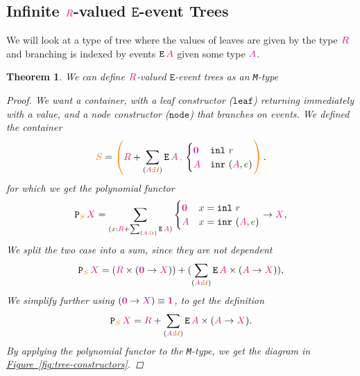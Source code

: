 \documentclass[twoside,11pt,openright]{report}
\theoremstyle{plain} %
\newtheorem{thm}{Theorem}[section]
\theoremstyle{definition}
\theoremstyle{remark}
\newcommand*{\figref}[1]{\hyperref[fig:#1]{Figure~\ref*{fig:#1}}}
\newcommand*{\term}[1]{\textcolor{green!30!black}{#1}} %
\newcommand*{\type}[1]{\textcolor{magenta!90!black}{#1}}
\newcommand*{\container}[1]{\textcolor{orange}{#1}}
\newcommand*{\containerpair}[2]{\ensuremath{\colorlet{savedleftcolor}{.}\color{orange}\left(\color{savedleftcolor}#1\,\textcolor{orange}{\mathbf{,}}\,#2\color{orange}\right)\color{savedleftcolor}}}
\newcommand*{\universe}[1]{\textcolor{orange!80!black}{#1}}
\newcommand*{\unit}{\type{\textbf{1}}}
\newcommand*{\empt}{\type{\textbf{0}}}
\newcommand*{\constructor}[1]{\textcolor{purple!60!black}{\ensuremath{\mathtt{#1}}}}
\newcommand*{\typeformer}[1]{\ensuremath{\mathtt{#1}}}
\newcommand*{\functor}[1]{\ensuremath{\mathbf{\mathtt{#1}}}}
\begin{document}
\subsection{Infinite \(\type{R}\)-valued \(\typeformer{E}\)-event Trees}
We will look at a type of tree where the values of leaves are given by the type \(\type{R}\) and branching is indexed by events \(\typeformer{E}\,\type{A}\) given some type \(\type{A}\).
\begin{thm}
  We can define \(\type{R}\)-valued \(\typeformer{E}\)-event trees as an \texttt{M}-type
  \begin{proof}
    We want a container, with a leaf constructor (\constructor{leaf}) returning immediately with a value, and a node constructor (\constructor{node}) that branches on events. We defined the container
  \begin{equation}
    \container{S} = \containerpair{\type{R} + \sum_{(\type{A} : \universe{\mathcal{U}})} \typeformer{E}\,\type{A}}{\begin{cases}\empt & \mathtt{inl}~\term{r} \\ \type{A} & \mathtt{inr}~(\type{A},\term{e})\end{cases}}.
  \end{equation}
for which we get the polynomial functor
\begin{equation}
  \functor{P}_{\container{S}}\,\type{X} = \sum_{(\term{x} : \type{R} + \sum_{(\type{A} : \universe{\mathcal{U}})} \typeformer{E}\,\type{A})} \begin{cases}\empt & \term{x} = \mathtt{inl}~\term{r} \\ \type{A} & \term{x} = \mathtt{inr}~(\type{A},\term{e})\end{cases} \rightarrow \type{X},
\end{equation}
We split the two case into a sum, since they are not dependent
\begin{equation}
  \functor{P}_{\container{S}}\,\type{X} = (\type{R} \times (\empt \rightarrow \type{X})) + (\sum_{(\type{A} : \universe{\mathcal{U}})} \typeformer{E}\,\type{A} \times (\type{A} \rightarrow \type{X})),
\end{equation}
We simplify further using \((\empt \rightarrow \type{X}) \equiv \unit\), to get the definition
\begin{equation}
  \functor{P}_{\container{S}}\,\type{X} = \type{R} + \sum_{(\type{A} : \universe{\mathcal{U}})} \typeformer{E}\,\type{A} \times (\type{A} \rightarrow \type{X}).
\end{equation}
By applying the polynomial functor to the \texttt{M}-type, we get the diagram in \figref{tree-constructors}. 

\end{proof}
\end{thm}
\end{document}
